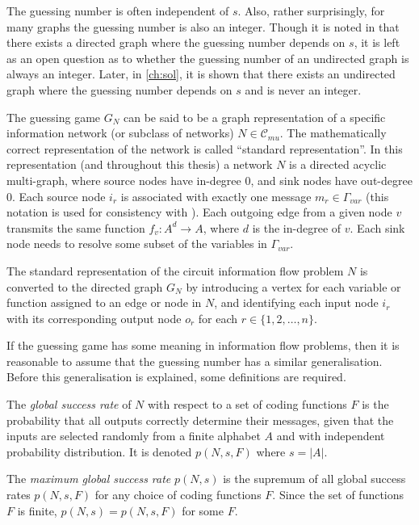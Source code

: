 The guessing number is often independent of $s$. Also, rather surprisingly, for many graphs the guessing number is also an integer. Though it is noted in \cite{riis2005util} that there exists a directed graph where the guessing number depends on $s$, it is left as an open question as to whether the guessing number of an undirected graph is always an integer. Later, in \autoref{ch:sol}, it is shown that there exists an undirected graph where the guessing number depends on $s$ and is never an integer.

The guessing game $G_N$ can be said to be a graph representation of a specific information network (or subclass of networks) $N \in \mathcal{C}_{mu}$. The mathematically correct representation of the network is called ``standard representation''. In this representation (and throughout this thesis) a network $N$ is a directed acyclic multi-graph, where source nodes have in-degree $0$, and sink nodes have out-degree $0$. Each source node $i_r$ is associated with exactly one message $m_r \in \Gamma_{var}$ (this notation is used for consistency with \cite{riis2005util}). Each outgoing edge from a given node $v$ transmits the same function $f_v : A^d \rightarrow A$, where $d$ is the in-degree of $v$. Each sink node needs to resolve some subset of the variables in $\Gamma_{var}$.

The standard representation of the circuit information flow problem $N$ is converted to the directed graph $G_N$ by introducing a vertex for each variable or function assigned to an edge or node in $N$, and identifying each input node $i_r$ with its corresponding output node $o_r$ for each $r \in \{1, 2, \dots, n\}$.

If the guessing game has some meaning in information flow problems, then it is reasonable to assume that the guessing number has a similar generalisation. Before this generalisation is explained, some definitions are required.

\begin{definition}

The \emph{global success rate} of $N$ with respect to a set of coding functions $F$ is the probability that all outputs correctly determine their messages, given that the inputs are selected randomly from a finite alphabet $A$ and with independent probability distribution. It is denoted $p(N, s, F)$ where $s = |A|$.

\newpage

The \emph{maximum global success rate} $p(N, s)$ is the supremum of all global success rates $p(N, s, F)$ for any choice of coding functions $F$. Since the set of functions $F$ is finite, $p(N, s) = p(N, s, F)$ for some $F$.

\end{definition}

